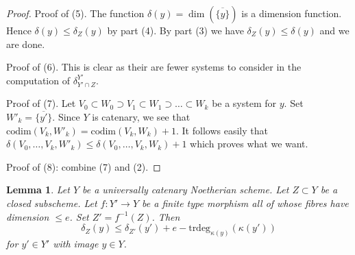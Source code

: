 \documentclass[10pt,a4paper]{amsart}
\theoremstyle{plain}
\newtheorem{lemma}[subsection]{Lemma}
\theoremstyle{definition}
\theoremstyle{remark}
\numberwithin{equation}{subsection}
\begin{document}
\begin{proof}
\medskip\noindent
Proof of (5). The function $\delta(y) = \dim(\overline{\{y\}})$
is a dimension function. Hence $\delta(y) \leq \delta_Z(y)$ by
part (4). By part (3) we have $\delta_Z(y) \leq \delta(y)$
and we are done.

\medskip\noindent
Proof of (6). This is clear as their are fewer systems to consider
in the computation of $\delta^{Y'}_{Y' \cap Z}$.

\medskip\noindent
Proof of (7). Let
$V_0 \subset W_0 \supset V_1 \subset W_1 \supset \ldots \subset W_k$
be a system for $y$. Set $W'_k = \overline{\{y'\}}$.
Since $Y$ is catenary, we see that
$\text{codim}(V_k, W'_k) = \text{codim}(V_k, W_k) + 1$.
It follows easily that $\delta(V_0, \ldots, V_k, W'_k) \leq
\delta(V_0, \ldots, V_k, W_k) + 1$ which proves what we want.

\medskip\noindent
Proof of (8): combine (7) and (2).
\end{proof}

\begin{lemma}
\label{lemma-change-distance-function}
Let $Y$ be a universally catenary Noetherian scheme. Let $Z \subset Y$
be a closed subscheme. Let $f : Y' \to Y$ be a finite type
morphism all of whose fibres have dimension $\leq e$. Set $Z' = f^{-1}(Z)$.
Then
$$
\delta_Z(y) \leq \delta_{Z'}(y') + e - \text{trdeg}_{\kappa(y)}(\kappa(y'))
$$
for $y' \in Y'$ with image $y \in Y$.
\end{lemma}
\end{document}
